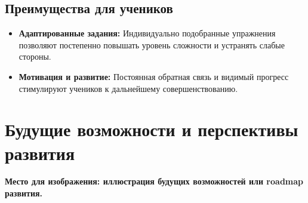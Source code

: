 \documentclass[a4paper,12pt]{article}
\begin{document}
\subsection{Преимущества для учеников}
\begin{itemize}
    \item \textbf{Адаптированные задания:} Индивидуально подобранные упражнения позволяют постепенно повышать уровень сложности и устранять слабые стороны.
    \item \textbf{Мотивация и развитие:} Постоянная обратная связь и видимый прогресс стимулируют учеников к дальнейшему совершенствованию.
\end{itemize}

\section{Будущие возможности и перспективы развития}


\vspace{0.5cm}
\noindent
\textbf{Место для изображения: иллюстрация будущих возможностей или roadmap развития.}
\begin{center}
\end{center}
\vspace{0.5cm}

\end{document}

